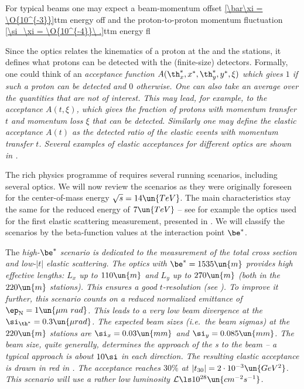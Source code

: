 For typical  beams one may expect a beam-momentum offset
\eqref{\bar\xi = \O{10^{-3}}}{ttm energy off}
and the proton-to-proton momentum fluctuation
\eqref{\si_\xi = \O{10^{-4}}\ .}{ttm energy fl}

Since the optics  relates the kinematics of a proton at the  and the  stations, it defines what protons can be detected with the (finite-size)  detectors. Formally, one could think of an \em{acceptance} function $A(\th_x^*, x^*, \th_y^*, y^*, \xi)$ which gives $1$ if such a proton can be detected and $0$ otherwise. One can also take an average over the quantities that are not of interest. This may lead, for example, to the acceptance $A(t, \xi)$, which gives the fraction of protons with momentum transfer $t$ and momentum loss $\xi$ that can be detected. Similarly one may define the \em{elastic acceptance} $A(t)$ as the detected ratio of the elastic events with momentum transfer $t$. Several examples of elastic acceptances for different optics are shown in .



The rich physics programme of  requires several running scenarios, including several optics. We will now review the scenarios as they were originally foreseen for the center-of-mass energy $\sqrt s = 14\un{TeV}$. The main characteristics stay the same for the reduced energy of $7\un{TeV}$ -- see for example the optics used for the first elastic scattering measurement, presented in . We will classify the scenarios by the beta-function values at the interaction point $\be^*$.

\> The \em{high-$\be^*$} scenario is dedicated to the measurement of the total cross section and low-$|t|$ elastic scattering. The optics with $\be^* = 1535\un{m}$ provides high effective lengths: $L_x$ up to $110\un{m}$ and $L_y$ up to $270\un{m}$ (both in the $220\un{m}$ stations). This ensures a good $t$-resolution (see ). To improve it further, this scenario counts on a reduced normalized emittance of $\ep_{\rm N}=1\un{\mu m\ rad}$. This leads to a very low beam divergence at the  $\si_{\th^*} = 0.3\un{\mu rad}$. The expected beam sizes (i.e.~the beam sigmas) at the $220\un{m}$ stations are $\si_x = 0.03\un{mm}$ and $\si_y = 0.085\un{mm}$. The beam size, quite generally, determines the approach of the s to the beam -- a typical approach is about $10\si$ in each direction. The resulting elastic acceptance is drawn in red in . The acceptance reaches $30\percent$ at $|t_{30}| = 2\cdot10^{-3}\un{GeV^2}$. This scenario will use a rather low luminosity ${\cal L} \ls 10^{28} \un{cm^{-2}s^{-1}}$.

